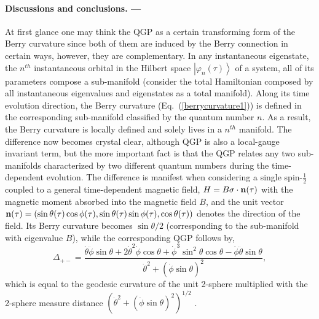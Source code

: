 \documentclass[aps,pra,twocolumn,
groupedaddress,10pt]{revtex4}
\def\be{\begin{equation}} \def\ee{\end{equation}}
\begin{document}


\paragraph*{Discussions and conclusions. ---}
At first glance one may think the QGP as a certain transforming form of
the Berry curvature\cite{Xiao2010}
since both of them are induced by the Berry connection in certain ways,
however, they are complementary.
In any instantaneous eigenstate, the $n^{th}$
instantaneous orbital in the Hilbert space $\left| {\varphi _n (\tau )} \right\rangle$
of a system, all of its parameters compose a sub-manifold (consider the
total Hamiltonian composed by all instantaneous eigenvalues and eigenstates
as a total manifold). Along its time evolution direction, the Berry curvature
(Eq.~(\ref{berrycurvature1}))
is defined in the corresponding sub-manifold classified by the quantum number $n$.
As a result, the Berry curvature
is locally defined and solely lives in a $n^{th}$ manifold.
The difference now becomes crystal clear, although QGP is
also a local-gauge invariant term,
but the more important fact is that the QGP relates any two
sub-manifolds characterized by two different quantum numbers during the time-dependent evolution.
The difference is manifest when considering a single spin-$\frac{1}{2}$
coupled to a general time-dependent magnetic field,
$H =  B {\bf{\sigma}}  \cdot { \bf{n}}(\tau )$
with the magnetic moment absorbed into the magnetic field $B$, and
the unit vector $\bf{n}(\tau )= (\sin \theta(\tau) \cos \phi(\tau), \sin \theta(\tau) \sin \phi(\tau), \cos \theta(\tau))$
denotes the direction of the field.
Its Berry curvature becomes $\sin \theta /2$
(corresponding to the sub-manifold with eigenvalue $B$),
while the corresponding QGP follows by,
\be
\Delta _{ +  - }  = \frac{{\dot \theta \ddot \phi \sin \theta  + 2\dot \theta ^2 \dot \phi \cos \theta  + \dot \phi ^3 \sin ^2 \theta \cos \theta  - \dot \phi \ddot \theta \sin \theta }}{{\dot \theta ^2  + (\dot \phi \sin \theta )^2 }},
\ee
which is equal to the geodesic curvature of the unit 2-sphere
multiplied with the 2-sphere measure distance
$(\dot \theta ^2  + (\dot \phi \sin \theta )^2 )^{1/2}$ \cite{Jianda2008}.
\end{document}
